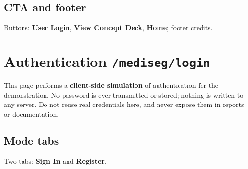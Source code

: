 \documentclass[11pt, a4paper]{article}
\begin{document}
\subsection{CTA and footer}
Buttons: \textbf{User Login}, \textbf{View Concept Deck}, \textbf{Home};
footer credits.

\section{Authentication \texttt{/mediseg/login}}

\begin{warnbox}
This page performs a \textbf{client-side simulation} of authentication for the
demonstration. No password is ever transmitted or stored; nothing is written to
any server. Do not reuse real credentials here, and never expose them in
reports or documentation.
\end{warnbox}

\subsection{Mode tabs}
Two tabs: \textbf{Sign In} and \textbf{Register}.
\end{document}
